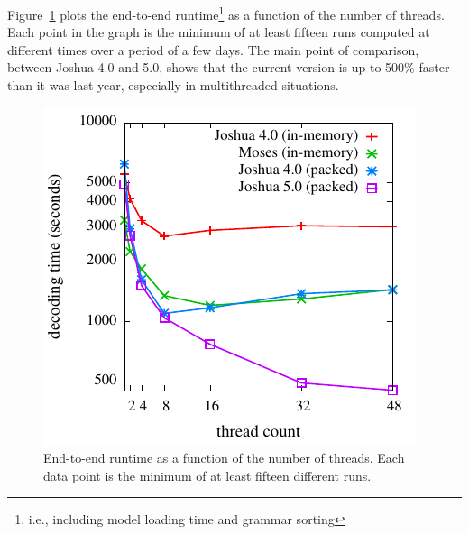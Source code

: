 \documentclass[11pt]{article}
\begin{document}
Figure~\ref{fig:cmp} plots the end-to-end runtime\footnote{i.e.,
  including model loading time and grammar sorting} as a function of
the number of threads.  Each point in the graph is the minimum of at
least fifteen runs computed at different times over a period of a few
days.  The main point of comparison, between Joshua 4.0 and 5.0, shows
that the current version is up to 500\% faster than it was last year,
especially in multithreaded situations.

\begin{figure}[!t]
  \begin{center}
    \includegraphics[width=0.99\linewidth]{plots/runtimes.pdf}
  \end{center}
  \caption{End-to-end runtime as a function of the number of threads.
    Each data point is the minimum of at least fifteen different
    runs.}
  \label{fig:cmp}
\end{figure}
\end{document}
